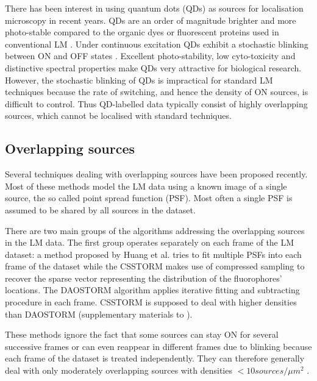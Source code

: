 There has been interest in using quantum dots (QDs) as sources for localisation microscopy in recent years. QDs are an order of magnitude brighter and more photo-stable compared to the organic dyes or fluorescent proteins used in conventional LM \cite{Resch-Genger2008}. Under continuous excitation QDs exhibit a stochastic blinking between ON and OFF states \cite{Kuno2001,Stefani2009}. Excellent photo-stability, low cyto-toxicity and distinctive spectral properties make QDs very attractive for biological research. However, the stochastic blinking of QDs is impractical for standard LM techniques because the rate of switching, and hence the density of ON sources, is difficult to control. Thus QD-labelled data typically consist of highly overlapping sources, which cannot be localised with standard techniques.


\subsection{Overlapping sources\label{sec:Overlapping sources}}

Several techniques dealing with overlapping sources have been proposed recently. Most of these methods model the LM data using a known image of a single source, the so called point spread function (PSF). Most often a single PSF is assumed to be shared by all sources in the dataset.

There are two main groups of the algorithms addressing the overlapping sources in the LM data. The first group operates separately on each frame of the LM dataset: a method proposed by Huang et al. \cite{Huang2011} tries to fit multiple PSFs into each frame of the dataset while the CSSTORM \cite{Zhu2012} makes use of compressed sampling to recover the sparse vector representing the distribution of the fluorophores' locations. The DAOSTORM algorithm \cite{Holden2011} applies iterative fitting and subtracting procedure in each frame. CSSTORM is supposed to deal with higher densities than DAOSTORM (supplementary materials to \cite{Zhu2012}).

These methods ignore the fact that some sources can stay ON for several successive frames or can even reappear in different frames due to blinking because each frame of the dataset is treated independently. They can therefore generally deal with only moderately overlapping sources with densities $<10\unit{sources/\mu m^{2}}$ \cite{Huang2011,Holden2011,Zhu2012}.

